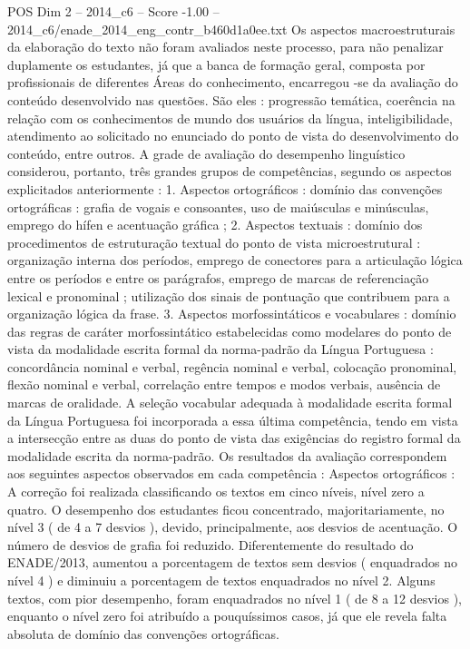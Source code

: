 \begin{textsample}{POS Dim 2 – 2014\_c6 – Score -1.00 – 2014\_c6/enade\_2014\_eng\_contr\_b460d1a0ee.txt}
Os aspectos macroestruturais da elaboração do texto não foram avaliados neste processo, para não penalizar duplamente os estudantes, já que a banca de formação geral, composta por profissionais de diferentes Áreas do conhecimento, encarregou -se da avaliação do conteúdo desenvolvido nas questões.
São eles : progressão temática, coerência na relação com os conhecimentos de mundo dos usuários da língua, inteligibilidade, atendimento ao solicitado no enunciado do ponto de vista do desenvolvimento do conteúdo, entre outros.
A grade de avaliação do desempenho linguístico considerou, portanto, três grandes grupos de competências, segundo os aspectos explicitados anteriormente : 1.
Aspectos ortográficos : domínio das convenções ortográficas : grafia de vogais e consoantes, uso de maiúsculas e minúsculas, emprego do hífen e acentuação gráfica ; 2.
Aspectos textuais : domínio dos procedimentos de estruturação textual do ponto de vista microestrutural : organização interna dos períodos, emprego de conectores para a articulação lógica entre os períodos e entre os parágrafos, emprego de marcas de referenciação lexical e pronominal ; utilização dos sinais de pontuação que contribuem para a organização lógica da frase. 3.
Aspectos morfossintáticos e vocabulares : domínio das regras de caráter morfossintático estabelecidas como modelares do ponto de vista da modalidade escrita formal da norma-padrão da Língua Portuguesa : concordância nominal e verbal, regência nominal e verbal, colocação pronominal, flexão nominal e verbal, correlação entre tempos e modos verbais, ausência de marcas de oralidade.
A seleção vocabular adequada à modalidade escrita formal da Língua Portuguesa foi incorporada a essa última competência, tendo em vista a intersecção entre as duas do ponto de vista das exigências do registro formal da modalidade escrita da norma-padrão.
Os resultados da avaliação correspondem aos seguintes aspectos observados em cada competência : Aspectos ortográficos : A correção foi realizada classificando os textos em cinco níveis, nível zero a quatro.
O desempenho dos estudantes ficou concentrado, majoritariamente, no nível 3 ( de 4 a 7 desvios ), devido, principalmente, aos desvios de acentuação.
O número de desvios de grafia foi reduzido.
Diferentemente do resultado do ENADE/2013, aumentou a porcentagem de textos sem desvios ( enquadrados no nível 4 ) e diminuiu a porcentagem de textos enquadrados no nível 2.
Alguns textos, com pior desempenho, foram enquadrados no nível 1 ( de 8 a 12 desvios ), enquanto o nível zero foi atribuído a pouquíssimos casos, já que ele revela falta absoluta de domínio das convenções ortográficas.

\end{textsample}
